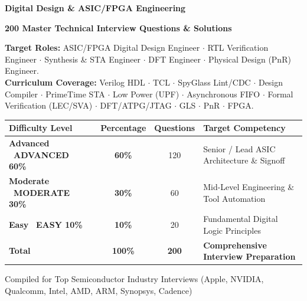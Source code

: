 \documentclass[11pt,a4paper]{article}
\newcommand{\badgeadv}{{\color{white}\colorbox{advred}{\bfseries\sffamily\tiny\ ADVANCED 60\%\ }}}
\newcommand{\badgemod}{{\color{white}\colorbox{modoran}{\bfseries\sffamily\tiny\ MODERATE 30\%\ }}}
\newcommand{\badgeeasy}{{\color{white}\colorbox{easygreen}{\bfseries\sffamily\tiny\ EASY 10\%\ }}}
\begin{document}
\begin{titlepage}
  \centering
  \vspace*{1.0cm}
  {\Huge\bfseries\sffamily\color{primaryblue} Digital Design \& ASIC/FPGA Engineering\par}
  \vspace{0.4cm}
  {\Large\bfseries\sffamily\color{secblue} 200 Master Technical Interview Questions \& Solutions\par}
  \vspace{0.8cm}
  
  \begin{mdframed}[style=qstyle]
    \centering\small\sffamily
    \textbf{Target Roles:} ASIC/FPGA Digital Design Engineer $\cdot$ RTL Verification Engineer $\cdot$ Synthesis \& STA Engineer $\cdot$ DFT Engineer $\cdot$ Physical Design (PnR) Engineer.\\[4pt]
    \textbf{Curriculum Coverage:} Verilog HDL $\cdot$ TCL $\cdot$ SpyGlass Lint/CDC $\cdot$ Design Compiler $\cdot$ PrimeTime STA $\cdot$ Low Power (UPF) $\cdot$ Asynchronous FIFO $\cdot$ Formal Verification (LEC/SVA) $\cdot$ DFT/ATPG/JTAG $\cdot$ GLS $\cdot$ PnR $\cdot$ FPGA.
  \end{mdframed}

  \vspace{0.8cm}

  \begin{table}[h!]
    \centering\small
    \begin{tabular}{p{3.2cm} c c p{6.8cm}}
      \toprule
      \textbf{Difficulty Level} & \textbf{Percentage} & \textbf{Questions} & \textbf{Target Competency} \\
      \midrule
      \textbf{Advanced} \badgeadv & \textbf{60\%} & 120 & Senior / Lead ASIC Architecture \& Signoff \\
      \textbf{Moderate} \badgemod & \textbf{30\%} & 60 & Mid-Level Engineering \& Tool Automation \\
      \textbf{Easy} \badgeeasy & \textbf{10\%} & 20 & Fundamental Digital Logic Principles \\
      \midrule
      \textbf{Total} & \textbf{100\%} & \textbf{200} & \textbf{Comprehensive Interview Preparation} \\
      \bottomrule
    \end{tabular}
  \end{table}

  \vfill
  {\small\sffamily\color{gray} Compiled for Top Semiconductor Industry Interviews (Apple, NVIDIA, Qualcomm, Intel, AMD, ARM, Synopsys, Cadence)\par}
  \vspace*{0.5cm}
\end{titlepage}
\end{document}
